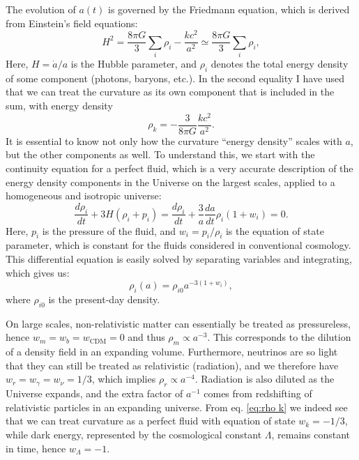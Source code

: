 \documentclass{aa}
\begin{document}
The evolution of $a(t)$ is governed by the Friedmann equation, which is derived from Einstein's field equations:
\begin{equation}
    H^2 = \frac{8\pi G}{3} \sum_{i}\rho_i - \frac{k c^2}{a^2} \simeq \frac{8\pi G}{3} \sum_{i}\rho_i,
\end{equation}
Here, $H = \dot{a}/a$ is the Hubble parameter, and $\rho_i$ denotes the total energy density of some component (photons, baryons, etc.). In the second equality I have used that we can treat the curvature as its own component that is included in the sum, with energy density
\begin{equation}
  \rho_k = -\frac{3}{8\pi G}\frac{k c^2}{a^2}. \label{eq:rho k}
\end{equation}
It is essential to know not only how the curvature ``energy density'' scales with $a$, but the other components as well. To understand this, we start with the continuity equation for a perfect fluid, which is a very accurate description of the energy density components in the Universe on the largest scales, applied to a homogeneous and isotropic universe:
\begin{equation}
  \frac{d\rho_i}{dt} + 3H (\rho_i+ p_i) = \frac{d\rho_i}{dt} + \frac{3}{a}\frac{da}{dt} \rho_i(1 + w_i) = 0.
\end{equation}
Here, $p_i$ is the pressure of the fluid, and $w_i=p_i/\rho_i$ is the equation of state parameter, which is constant for the fluids considered in conventional cosmology. This differential equation is easily solved by separating variables and integrating, which gives us:
\begin{equation}
  \rho_i(a) = \rho_{i0} a^{-3(1+w_i)},
\end{equation}
where $\rho_{i0}$ is the present-day density.

On large scales, non-relativistic matter can essentially be treated as pressureless, hence $w_m = w_b=w_\text{CDM}=0$ and thus $\rho_m \propto a^{-3}$. This corresponds to the dilution of a density field in an expanding volume. Furthermore, neutrinos are so light that they can still be treated as relativistic (radiation), and we therefore have $w_r=w_\gamma=w_\nu=1/3$, which implies $\rho_r\propto a^{-4}$. Radiation is also diluted as the Universe expands, and the extra factor of $a^{-1}$ comes from redshifting of relativistic particles in an expanding universe. From eq. \eqref{eq:rho k} we indeed see that we can treat curvature as a perfect fluid with equation of state $w_k=-1/3$, while dark energy, represented by the cosmological constant $\Lambda$, remains constant in time, hence $w_\Lambda=-1$. 
\end{document}
